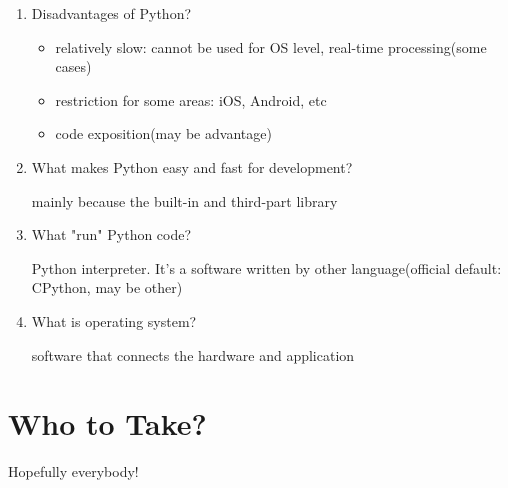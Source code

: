 \documentclass[10pt,a4paper,oneside]{article}
\begin{document}
\begin{enumerate}
	\item Disadvantages of Python?
	\begin{itemize}
		\item relatively slow: cannot be used for OS level, real-time processing(some cases)
		\item restriction for some areas: iOS, Android, etc
		\item code exposition(may be advantage)
	\end{itemize}

	\item What makes Python easy and fast for development?
	
	mainly because the built-in and third-part library
	
	\item What "run" Python code?
	
	Python interpreter. It's a software written by other language(official default: CPython, may be other)
	
	\item What is operating system?
	
	software that connects the hardware and application
	

\end{enumerate}


\section{Who to Take?}
Hopefully everybody!
\end{document}
